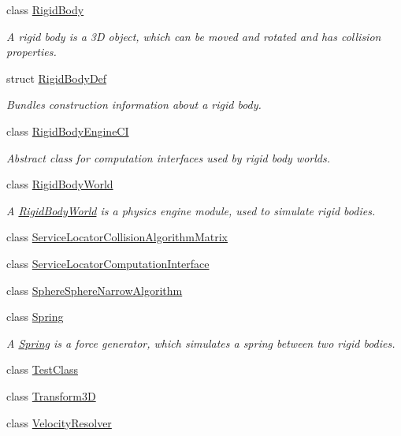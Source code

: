 \begin{DoxyCompactItemize}
\item 
class \mbox{\hyperlink{classr3_1_1_rigid_body}{Rigid\+Body}}
\begin{DoxyCompactList}\small\item\em A rigid body is a 3D object, which can be moved and rotated and has collision properties. \end{DoxyCompactList}\item 
struct \mbox{\hyperlink{structr3_1_1_rigid_body_def}{Rigid\+Body\+Def}}
\begin{DoxyCompactList}\small\item\em Bundles construction information about a rigid body. \end{DoxyCompactList}\item 
class \mbox{\hyperlink{classr3_1_1_rigid_body_engine_c_i}{Rigid\+Body\+Engine\+CI}}
\begin{DoxyCompactList}\small\item\em Abstract class for computation interfaces used by rigid body worlds. \end{DoxyCompactList}\item 
class \mbox{\hyperlink{classr3_1_1_rigid_body_world}{Rigid\+Body\+World}}
\begin{DoxyCompactList}\small\item\em A \mbox{\hyperlink{classr3_1_1_rigid_body_world}{Rigid\+Body\+World}} is a physics engine module, used to simulate rigid bodies. \end{DoxyCompactList}\item 
class \mbox{\hyperlink{classr3_1_1_service_locator_collision_algorithm_matrix}{Service\+Locator\+Collision\+Algorithm\+Matrix}}
\item 
class \mbox{\hyperlink{classr3_1_1_service_locator_computation_interface}{Service\+Locator\+Computation\+Interface}}
\item 
class \mbox{\hyperlink{classr3_1_1_sphere_sphere_narrow_algorithm}{Sphere\+Sphere\+Narrow\+Algorithm}}
\item 
class \mbox{\hyperlink{classr3_1_1_spring}{Spring}}
\begin{DoxyCompactList}\small\item\em A \mbox{\hyperlink{classr3_1_1_spring}{Spring}} is a force generator, which simulates a spring between two rigid bodies. \end{DoxyCompactList}\item 
class \mbox{\hyperlink{classr3_1_1_test_class}{Test\+Class}}
\item 
class \mbox{\hyperlink{classr3_1_1_transform3_d}{Transform3D}}
\item 
class \mbox{\hyperlink{classr3_1_1_velocity_resolver}{Velocity\+Resolver}}
\end{DoxyCompactItemize}
